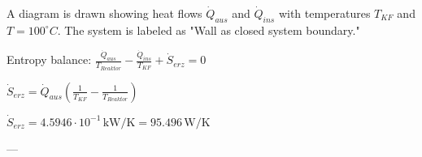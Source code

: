 A diagram is drawn showing heat flows \( \dot{Q}_{aus} \) and \( \dot{Q}_{ins} \) with temperatures \( T_{KF} \) and \( T = 100^\circ C \). The system is labeled as "Wall as closed system boundary."  

Entropy balance:  
\( \frac{\dot{Q}_{aus}}{T_{Reaktor}} - \frac{\dot{Q}_{ins}}{T_{KF}} + \dot{S}_{erz} = 0 \)  

\( \dot{S}_{erz} = \dot{Q}_{aus} \left( \frac{1}{T_{KF}} - \frac{1}{T_{Reaktor}} \right) \)  

\( \dot{S}_{erz} = 4.5946 \cdot 10^{-1} \, \text{kW/K} = 95.496 \, \text{W/K} \)  

---